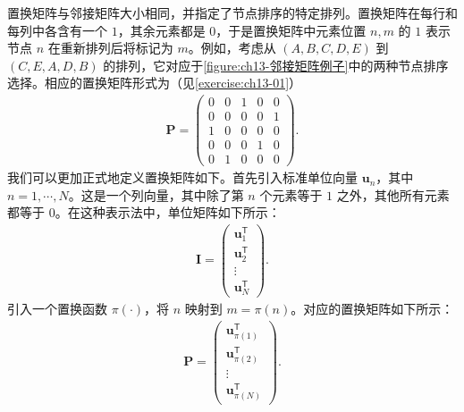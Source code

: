 \documentclass[../../main.tex]{subfiles}
\begin{document}
\begin{definition}[置换矩阵]\label{definition:ch13-置换矩阵}
置换矩阵与邻接矩阵大小相同，并指定了节点排序的特定排列。置换矩阵在每行和每列中各含有一个 $1$，其余元素都是 $0$，于是置换矩阵中元素位置 $n,m$ 的 $1$ 表示节点 $n$ 在重新排列后将标记为 $m$。例如，考虑从 $(A,B,C,D,E)$ 到 $(C,E,A,D,B)$ 的排列，它对应于\cref{figure:ch13-邻接矩阵例子}中的两种节点排序选择。相应的置换矩阵形式为（见\cref{exercise:ch13-01}）
\begin{align}
\bm{P}=\begin{pmatrix}0&0&1&0&0\\0&0&0&0&1\\1&0&0&0&0\\0&0&0&1&0\\0&1&0&0&0\end{pmatrix}.
\label{align:ch13-置换矩阵例子}
\end{align}
我们可以更加正式地定义置换矩阵如下。首先引入标准单位向量 $\bm{u}_n$，其中 $n=1,\cdots,N$。这是一个列向量，其中除了第 $n$ 个元素等于 $1$ 之外，其他所有元素都等于 $0$。在这种表示法中，单位矩阵如下所示：
\begin{align}
\bm{I}=\begin{pmatrix}\bm{u}_1^{\mathsf T}\\\bm{u}_2^{\mathsf T}\\\vdots\\\bm{u}_N^{\mathsf T}\end{pmatrix}.
\label{align:ch13-单位矩阵}
\end{align}
引入一个置换函数 $\pi(\cdot)$，将 $n$ 映射到 $m=\pi(n)$。对应的置换矩阵如下所示：
\begin{align}
\bm{P}=\begin{pmatrix}\bm{u}_{\pi(1)}^{\mathsf T}\\\bm{u}_{\pi(2)}^{\mathsf T}\\\vdots\\\bm{u}_{\pi(N)}^{\mathsf T}\end{pmatrix}.
\label{align:ch13-置换矩阵一般形式}
\end{align}
\end{definition}
\end{document}
